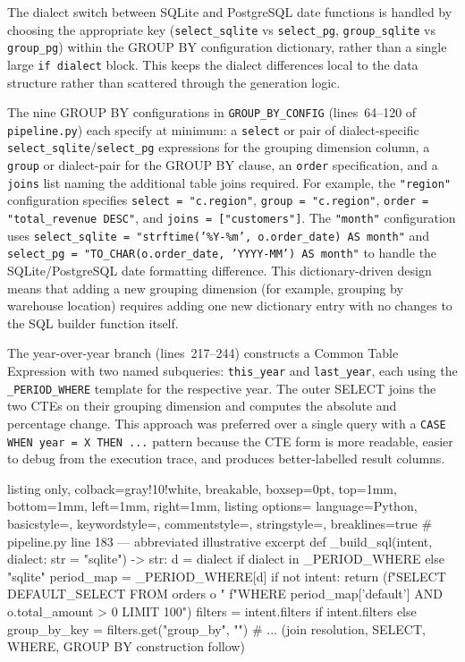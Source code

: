 \documentclass[12pt,a4paper]{report}
\begin{document}
The dialect switch between SQLite and PostgreSQL date functions is handled by choosing the appropriate key (\texttt{select\_sqlite} vs \texttt{select\_pg}, \texttt{group\_sqlite} vs \texttt{group\_pg}) within the GROUP BY configuration dictionary, rather than a single large \texttt{if dialect} block. This keeps the dialect differences local to the data structure rather than scattered through the generation logic.

The nine GROUP BY configurations in \texttt{GROUP\_BY\_CONFIG} (lines~64--120 of \texttt{pipeline.py}) each specify at minimum: a \texttt{select} or pair of dialect-specific \texttt{select\_sqlite}/\texttt{select\_pg} expressions for the grouping dimension column, a \texttt{group} or dialect-pair for the GROUP BY clause, an \texttt{order} specification, and a \texttt{joins} list naming the additional table joins required. For example, the \texttt{"region"} configuration specifies \texttt{select = "c.region"}, \texttt{group = "c.region"}, \texttt{order = "total\_revenue DESC"}, and \texttt{joins = ["customers"]}. The \texttt{"month"} configuration uses \texttt{select\_sqlite = "strftime('\%Y-\%m', o.order\_date) AS month"} and \texttt{select\_pg = "TO\_CHAR(o.order\_date, 'YYYY-MM') AS month"} to handle the SQLite/PostgreSQL date formatting difference. This dictionary-driven design means that adding a new grouping dimension (for example, grouping by warehouse location) requires adding one new dictionary entry with no changes to the SQL builder function itself.

The year-over-year branch (lines~217--244) constructs a Common Table Expression with two named subqueries: \texttt{this\_year} and \texttt{last\_year}, each using the \texttt{\_PERIOD\_WHERE} template for the respective year. The outer SELECT joins the two CTEs on their grouping dimension and computes the absolute and percentage change. This approach was preferred over a single query with a \texttt{CASE WHEN year = X THEN ...} pattern because the CTE form is more readable, easier to debug from the execution trace, and produces better-labelled result columns.

\begin{tcblisting}{listing only, colback=gray!10!white, breakable, boxsep=0pt,
  top=1mm, bottom=1mm, left=1mm, right=1mm,
  listing options={
    language=Python, basicstyle=\small\ttfamily,
    keywordstyle=\color{kwcolor}, commentstyle=\color{cmtcolor},
    stringstyle=\color{strcolor}, breaklines=true}}
# pipeline.py line 183 — abbreviated illustrative excerpt
def _build_sql(intent, dialect: str = "sqlite") -> str:
    d = dialect if dialect in _PERIOD_WHERE else "sqlite"
    period_map = _PERIOD_WHERE[d]
    if not intent:
        return (f"SELECT {DEFAULT_SELECT} FROM orders o "
                f"WHERE {period_map['default']} AND o.total_amount > 0 LIMIT 100")
    filters = intent.filters if intent.filters else {}
    group_by_key = filters.get("group_by", "")
    # ... (join resolution, SELECT, WHERE, GROUP BY construction follow)
\end{tcblisting}
\end{document}
